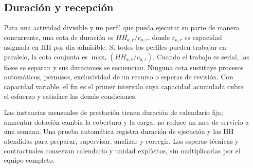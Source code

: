 \subsection{Duración y recepción}
Para una actividad divisible y un perfil que pueda ejecutar su parte de manera concurrente, una cota de duración es $HH_{a,r}/c_{a,r}$, donde $c_{a,r}$ es capacidad asignada en HH por día admisible. Si todos los perfiles pueden trabajar en paralelo, la cota conjunta es $\max_r(HH_{a,r}/c_{a,r})$. Cuando el trabajo es serial, las fases se separan y sus duraciones se secuencian. Ninguna cota sustituye procesos automáticos, permisos, exclusividad de un recurso o esperas de revisión. Con capacidad variable, el fin es el primer intervalo cuya capacidad acumulada cubre el esfuerzo y satisface las demás condiciones.

Las instancias mensuales de prestación tienen duración de calendario fija; aumentar dotación cambia la cobertura y la carga, no reduce un mes de servicio a una semana. Una prueba automática registra duración de ejecución y las HH atendidas para preparar, supervisar, analizar y corregir. Las esperas técnicas y contractuales conservan calendario y unidad explícitos, sin multiplicarlas por el equipo completo.

